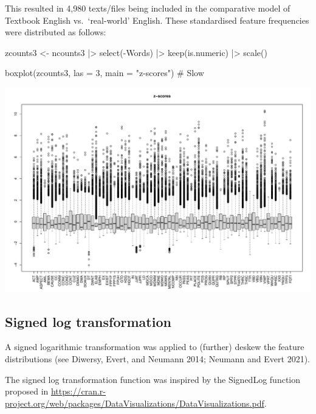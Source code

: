 \documentclass[
  letterpaper,
  DIV=11,
  numbers=noendperiod]{scrreprt}
\newenvironment{Shaded}{\begin{snugshade}}{\end{snugshade}}
\newcommand{\AttributeTok}[1]{\textcolor[rgb]{0.40,0.45,0.13}{#1}}
\newcommand{\CommentTok}[1]{\textcolor[rgb]{0.37,0.37,0.37}{#1}}
\newcommand{\DecValTok}[1]{\textcolor[rgb]{0.68,0.00,0.00}{#1}}
\newcommand{\FunctionTok}[1]{\textcolor[rgb]{0.28,0.35,0.67}{#1}}
\newcommand{\NormalTok}[1]{\textcolor[rgb]{0.00,0.23,0.31}{#1}}
\newcommand{\OtherTok}[1]{\textcolor[rgb]{0.00,0.23,0.31}{#1}}
\newcommand{\SpecialCharTok}[1]{\textcolor[rgb]{0.37,0.37,0.37}{#1}}
\newcommand{\StringTok}[1]{\textcolor[rgb]{0.13,0.47,0.30}{#1}}
\begin{document}
This resulted in 4,980 texts/files being included in the comparative
model of Textbook English vs.~`real-world' English. These standardised
feature frequencies were distributed as follows:

\begin{Shaded}
\begin{Highlighting}[]
\NormalTok{zcounts3 }\OtherTok{\textless{}{-}}\NormalTok{ ncounts3 }\SpecialCharTok{|\textgreater{}}
  \FunctionTok{select}\NormalTok{(}\SpecialCharTok{{-}}\NormalTok{Words) }\SpecialCharTok{|\textgreater{}} 
  \FunctionTok{keep}\NormalTok{(is.numeric) }\SpecialCharTok{|\textgreater{}} 
  \FunctionTok{scale}\NormalTok{()}

\FunctionTok{boxplot}\NormalTok{(zcounts3, }\AttributeTok{las =} \DecValTok{3}\NormalTok{, }\AttributeTok{main =} \StringTok{"z{-}scores"}\NormalTok{) }\CommentTok{\# Slow}
\end{Highlighting}
\end{Shaded}

\includegraphics{AppendixG_files/figure-pdf/z-transformed-distributions-1.pdf}

\subsection{Signed log
transformation}\label{signed-log-transformation-1}

A signed logarithmic transformation was applied to (further) deskew the
feature distributions (see Diwersy, Evert, and Neumann 2014; Neumann and
Evert 2021).

The signed log transformation function was inspired by the SignedLog
function proposed in
\url{https://cran.r-project.org/web/packages/DataVisualizations/DataVisualizations.pdf}.
\end{document}

